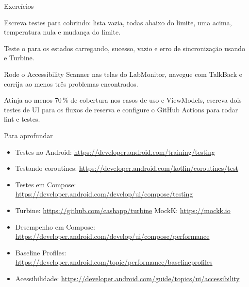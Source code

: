 \documentclass[aspectratio=169,10pt]{beamer}
\begin{document}
\begin{frame}{Exercícios}
  \begin{exercicio}
    Escreva testes para  cobrindo: lista vazia, todas abaixo do limite, uma acima, temperatura nula e mudança do limite.
  \end{exercicio}
  \begin{exercicio}
    Teste o  para os estados carregando, sucesso, vazio e erro de sincronização usando  e Turbine.
  \end{exercicio}
  \begin{exercicio}
    Rode o Accessibility Scanner nas telas do LabMonitor, navegue com TalkBack e corrija ao menos três problemas encontrados.
  \end{exercicio}
  \begin{projeto}
    Atinja ao menos 70\,\% de cobertura nos casos de uso e ViewModels, escreva dois testes de UI para os fluxos de reserva e configure o GitHub Actions para rodar lint e testes.
  \end{projeto}
\end{frame}

\begin{frame}{Para aprofundar}
  \small
  \begin{itemize}
    \item Testes no Android: \url{https://developer.android.com/training/testing}
    \item Testando coroutines: \url{https://developer.android.com/kotlin/coroutines/test}
    \item Testes em Compose: \url{https://developer.android.com/develop/ui/compose/testing}
    \item Turbine: \url{https://github.com/cashapp/turbine} \quad MockK: \url{https://mockk.io}
    \item Desempenho em Compose: \url{https://developer.android.com/develop/ui/compose/performance}
    \item Baseline Profiles: \url{https://developer.android.com/topic/performance/baselineprofiles}
    \item Acessibilidade: \url{https://developer.android.com/guide/topics/ui/accessibility}
  \end{itemize}
\end{frame}
\end{document}
